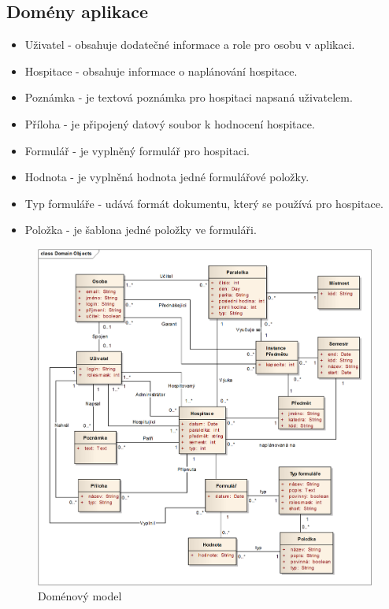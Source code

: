 \subsection{Domény aplikace}
\begin{itemize}
\item Uživatel - obsahuje dodatečné informace a role pro osobu v aplikaci.
\item Hospitace - obsahuje informace o naplánování hospitace. 
\item Poznámka - je textová poznámka pro hospitaci napsaná uživatelem.
\item Příloha - je připojený datový soubor k hodnocení hospitace.
\item Formulář - je vyplněný formulář pro hospitaci.
\item Hodnota - je vyplněná hodnota jedné formulářové položky.
\item Typ formuláře - udává formát dokumentu, který se používá pro hospitace. 
\item Položka - je šablona jedné položky ve formuláři.
\end{itemize}

\begin{figure}[h]
\begin{center}
\includegraphics[width=14cm]{figures/DomainModel}
\caption{Doménový model}
\label{fig:domainmodel}
\end{center}
\end{figure}

